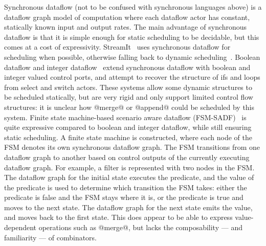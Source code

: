 Synchronous dataflow (not to be confused with synchronous languages above) is a dataflow graph model of computation where each dataflow actor has constant, statically known input and output rates.
The main advantage of synchronous dataflow is that it is simple enough for static scheduling to be decidable, but this comes at a cost of expressivity.
StreamIt~\cite{thies2002streamit} uses synchronous dataflow for scheduling when possible, otherwise falling back to dynamic scheduling~\cite{soule2013dynamic}.
Boolean dataflow and integer dataflow~\cite{buck1993scheduling,buck1994static} extend synchronous dataflow with boolean and integer valued control ports, and attempt to recover the structure of ifs and loops from select and switch actors.
These systems allow some dynamic structures to be scheduled statically, but are very rigid and only support limited control flow structures: it is unclear how @merge@ or @append@ could be scheduled by this system.
Finite state machine-based scenario aware dataflow (FSM-SADF)~\cite{stuijk2011scenario,van2015scenario} is quite expressive compared to boolean and integer dataflow, while still ensuring static scheduling.
A finite state machine is constructed, where each node of the FSM denotes its own synchronous dataflow graph.
The FSM transitions from one dataflow graph to another based on control outputs of the currently executing dataflow graph.
For example, a filter is represented with two nodes in the FSM.
The dataflow graph for the initial state executes the predicate, and the value of the predicate is used to determine which transition the FSM takes: either the predicate is false and the FSM stays where it is, or the predicate is true and moves to the next state.
The dataflow graph for the next state emits the value, and moves back to the first state.
This does appear to be able to express value-dependent operations such as @merge@, but lacks the composability --- and familiarity --- of combinators.

% 


